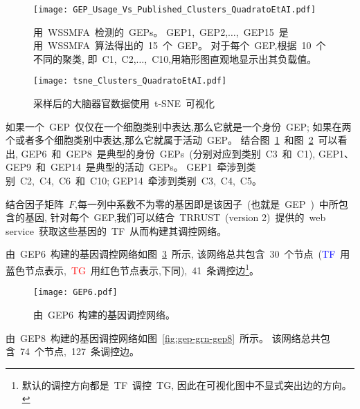 \begin{figure}[!htbp]
    \centering
    \texttt{[image: GEP\_Usage\_Vs\_Published\_Clusters\_QuadratoEtAI.pdf]}
    \caption{
    用~WSSMFA~检测的~GEPs。
    GEP1,~GEP2,$\ldots$,~GEP15~是用~WSSMFA~算法得出的~15~个~GEP。
    对于每个~GEP,根据~10~个不同的聚类,
    即~C1,~C2,$\ldots$,~C10,用箱形图直观地显示出其负载值。 
    }
    \label{fig:gep-gep}
\end{figure}


\begin{figure}[!htbp]
    \centering
    \texttt{[image: tsne\_Clusters\_QuadratoEtAI.pdf]}
    \caption{
    采样后的大脑器官数据使用~t-SNE~可视化
    }
    \label{fig:gep-tsne}
\end{figure}

如果一个~GEP~仅仅在一个细胞类别中表达,那么它就是一个身份~GEP;
如果在两个或者多个细胞类别中表达,那么它就属于活动~GEP。
结合图~\ref{fig:gep-gep}~和图~\ref{fig:gep-tsne}~可以看出, 
GEP6~和~GEP8~是典型的身份~GEPs~(分别对应到类别~C3~和~C1), GEP1、GEP9~和~GEP14~是典型的活动~GEPs。
GEP1~牵涉到类别~C2,~C4,~C6~和~C10; GEP14~牵涉到类别~C3,~C4,~C5。


结合因子矩阵~$F$,每一列中系数不为零的基因即是该因子~(也就是~GEP~)~中所包含的基因,
针对每个~GEP,我们可以结合~TRRUST~(version 2)~提供的~web service~获取这些基因的~TF~从而构建其调控网络。

由~GEP6~构建的基因调控网络如图~\ref{fig:gep-grn-gep6}~所示,
该网络总共包含~30~个节点~(\textcolor{blue}{TF}~用蓝色节点表示,~\textcolor{red}{TG}~用红色节点表示,下同),~41~条调控边\footnote{默认的调控方向都是~TF~调控~TG, 因此在可视化图中不显式突出边的方向。
}。
\begin{figure}[!htbp]
    \centering
    \texttt{[image: GEP6.pdf]}
    \caption{由~GEP6~构建的基因调控网络。}
    \label{fig:gep-grn-gep6}
\end{figure}

由~GEP8~构建的基因调控网络如图~\ref{fig:gep-grn-gep8}~所示。
该网络总共包含~74~个节点,~127~条调控边。

